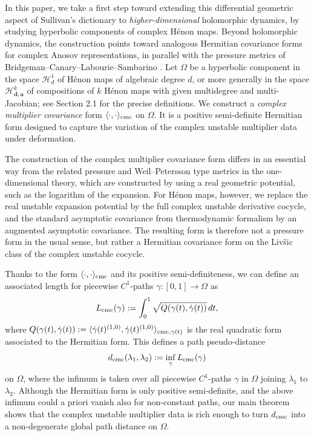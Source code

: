 \documentclass[11pt]{amsart}
\theoremstyle{plain}
\theoremstyle{definition}
\theoremstyle{remark}
\begin{document}
In this paper, we take a first step toward extending this differential geometric aspect of Sullivan's dictionary to {\it higher-dimensional} holomorphic dynamics, by studying hyperbolic components of complex H\'enon maps.
Beyond holomorphic dynamics, the construction points toward analogous Hermitian covariance forms for complex Anosov representations, in parallel with the pressure metrics of Bridgeman--Canary--Labourie--Sambarino \cite{BCLS15}.
Let $\Omega$ be a hyperbolic component in  
the space $\mathcal H^1_d$
of Hénon maps of algebraic degree $d$, or more generally in
the space $\mathcal H^k_{\mathbf d,\mathbf a}$
of compositions of $k$ Hénon maps
with 
given multidegree and 
multi-Jacobian; see Section 2.1 for the precise definitions. We construct a
\emph{complex multiplier covariance} form
$\langle\cdot,\cdot\rangle_{\rm cmc}$
 on $\Omega$. It is a 
positive semi-definite Hermitian form designed to capture the variation of the complex unstable multiplier data under deformation. 

The construction of the 
complex multiplier covariance form 
differs
in an essential way from the 
related pressure and
Weil--Petersson type
metrics in the one-dimensional theory, which 
are constructed by using a real geometric potential, such as the logarithm of the expansion. For H\'enon maps, however, we replace the real unstable expansion potential by the full complex unstable derivative cocycle, and the standard asymptotic covariance from thermodynamic formalism by an augmented asymptotic covariance. The resulting form is therefore not a pressure form in the usual sense, but rather a Hermitian covariance form on the Liv\v{s}ic class of the complex unstable cocycle.

Thanks to the form 
$\langle\cdot,\cdot\rangle_{\rm cmc}$ and its
positive semi-definiteness,
 we can define
 an associated length
 for piecewise $C^1$-paths
 $\gamma \colon [0,1]\to\Omega$ as
$$
L_{\rm cmc}(\gamma) := \int_0^1
\sqrt{Q(\gamma(t),\dot\gamma(t))}\,dt,
$$
where $Q(\gamma(t),\dot{\gamma}(t)) := \langle \dot{\gamma}(t)^{(1,0)}, \dot{\gamma}(t)^{(1,0)}\rangle_{\rm cmc,\gamma(t)}$ is the real quadratic form associated to the Hermitian form.
This defines a 
path pseudo-distance
$$
d_{\rm cmc}(\lambda_1,\lambda_2):=
\inf_\gamma L_{\rm cmc}(\gamma)
$$
on $\Omega$,
where the infimum is taken over all piecewise $C^1$-paths
$\gamma$ in $\Omega$ joining $\lambda_1$ to $\lambda_2$.
Although the Hermitian form is only positive semi-definite,
and the above infimum
could
a priori vanish also for non-constant paths,
our main theorem shows that the complex unstable multiplier data is rich enough to turn 
$d_{\rm cmc}$
into a non-degenerate global path distance on $\Omega$.
\end{document}
